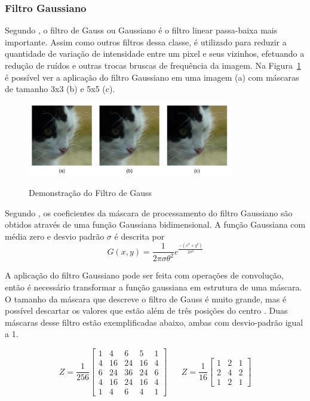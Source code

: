 \documentclass[12pt,oneside,a4paper,english,french,spanish,brazil,]{abntex2}
\begin{document}
\subsubsection{Filtro Gaussiano}

Segundo \citet{conci:2003}, o filtro de Gauss ou Gaussiano é o filtro linear passa-baixa mais importante. Assim como outros filtros dessa classe, é utilizado para reduzir a quantidade de variação de intensidade entre um pixel e seus vizinhos, efetuando a redução de ruídos e outras trocas bruscas de frequência da imagem. Na Figura~\ref{fig:PDI_Gauss} é possível ver a aplicação do filtro Gaussiano em uma imagem (a) com máscaras de tamanho 3x3 (b) e 5x5 (c).

\begin{figure}[ht]
\centering
\caption{Demonstração do Filtro de Gauss}
\includegraphics[width=0.8\textwidth]{imagens/PDI_Gauss.pdf}
\sourceAuthor
\label{fig:PDI_Gauss}
\end{figure}

Segundo \citet{pedrini:2008}, os coeficientes da máscara de processamento do filtro Gaussiano são obtidos através de uma função Gaussiana bidimensional. A função Gaussiana com média zero e desvio padrão \(\sigma\) é descrita por \[G(x,y)=\frac{1}{2\pi\sigma\theta^2} e^{\frac{-(x^2+y^2)}{2\sigma^2}  }\]

A aplicação do filtro Gaussiano pode ser feita com operações de convolução, então é necessário transformar a função gaussiana em estrutura de uma máscara. O tamanho da máscara que descreve o filtro de Gauss é muito grande, mas é possível descartar os valores que estão além de três posições do centro \cite{conci:2003}. Duas máscaras desse filtro estão exemplificadas abaixo, ambas com desvio-padrão igual a 1.

\[Z=\frac{1}{256}\begin{bmatrix}
1 & 4 & 6 & 5 & 1\\ 
4 & 16 & 24 & 16 & 4\\ 
6 & 24 & 36 & 24 & 6\\ 
4 & 16 & 24 & 16 & 4\\ 
1 & 4 & 6 & 4 & 1
\end{bmatrix}
\; \; \; \; \; \; 
Z=\frac{1}{16}\begin{bmatrix}
1 & 2 & 1\\ 
2 & 4 & 2\\ 
1 & 2 & 1
\end{bmatrix}
\]
\end{document}
